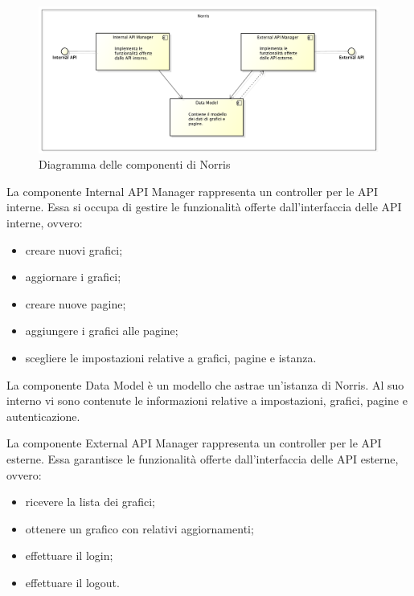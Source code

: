 
	\begin{figure}[H]\centering
        \includegraphics[width=\textwidth]{SpecificaTecnica/Pics/ComponentiNorris}
        \caption{Diagramma delle componenti di Norris}
    \end{figure}



			La componente Internal API Manager rappresenta un controller per le API interne. Essa si occupa di gestire le funzionalità offerte dall'interfaccia delle API interne, ovvero:
			\begin{itemize}
				\item creare nuovi grafici;
				\item aggiornare i grafici;
				\item creare nuove pagine;
				\item aggiungere i grafici alle pagine;
				\item scegliere le impostazioni relative a grafici, pagine e istanza.
			\end{itemize}


			La componente Data Model è un modello che astrae un'istanza di Norris. Al suo interno vi sono contenute le informazioni relative a impostazioni, grafici, pagine e autenticazione.

			La componente External API Manager rappresenta un controller per le API esterne. Essa garantisce le funzionalità offerte dall'interfaccia delle API esterne, ovvero:
			\begin{itemize}
				\item ricevere la lista dei grafici;
				\item ottenere un grafico con relativi aggiornamenti;
				\item effettuare il login;
				\item effettuare il logout.
			\end{itemize}

